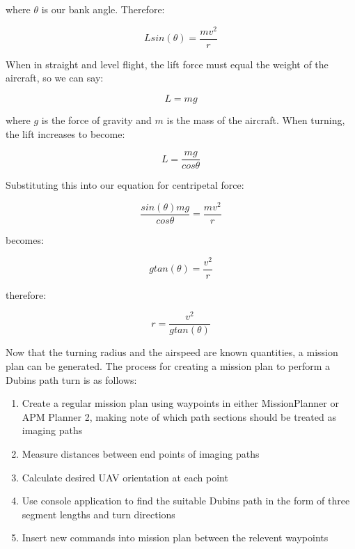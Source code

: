 where $\theta$ is our bank angle. Therefore:

\begin{equation}
	Lsin(\theta) = \frac{mv^2}{r}
\end{equation}

When in straight and level flight, the lift force must equal the weight of the aircraft, so we can say:

\begin{equation}
	L = mg
\end{equation}

where $g$ is the force of gravity and $m$ is the mass of the aircraft. When turning, the lift increases to become:

\begin{equation}
	L = \frac{mg}{cos\theta}
\end{equation}

Substituting this into our equation for centripetal force:

\begin{equation}
	\frac{sin(\theta)mg}{cos\theta} = \frac{mv^2}{r}
\end{equation}
 
 becomes:

\begin{equation}
	gtan(\theta) = \frac{v^2}{r}
\end{equation}

therefore:

\begin{equation} \label{eq:turnradius}
	r = \frac{v^2}{gtan(\theta)}
\end{equation}

Now that the turning radius and the airspeed are known quantities, a mission plan can be generated. The process for creating a mission plan to perform a Dubins path turn is as follows:
\begin{enumerate}
	\item Create a regular mission plan using waypoints in either MissionPlanner or APM Planner 2, making note of which path sections should be treated as imaging paths
	\item Measure distances between end points of imaging paths
	\item Calculate desired UAV orientation at each point
	\item Use console application to find the suitable Dubins path in the form of three segment lengths and turn directions
	\item Insert new commands into mission plan between the relevent waypoints
\end{enumerate}

